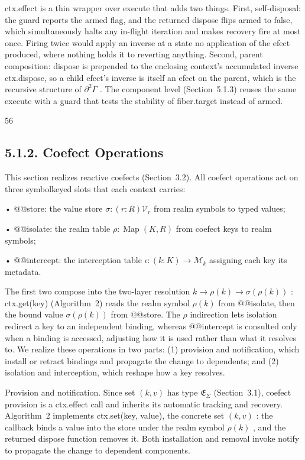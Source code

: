 \documentclass[
  10
]{article}
\begin{document}
ctx.effect is a thin wrapper over execute that adds two things. First,
self-disposal: the guard reports the armed flag, and the returned
dispose flips armed to false, which simultaneously halts any in-flight
iteration and makes recovery fire at most once. Firing twice would apply
an inverse at a state no application of the efect produced, where
nothing holds it to reverting anything. Second, parent composition:
dispose is prepended to the enclosing context's accumulated inverse
ctx.dispose, so a child efect's inverse is itself an efect on the
parent, which is the recursive structure of \(\partial ^ { 2 } \Gamma\)
. The component level (Section~5.1.3) reuses the same execute with a
guard that tests the stability of fiber.target instead of armed.

56

\subsection{5.1.2. Coefect Operations}\label{coefect-operations}

This section realizes reactive coefects (Section~3.2). All coefect
operations act on three symbolkeyed slots that each context carries:

• @@store: the value store
\(\sigma : ( r : R )  \mathcal { V } _ { r }\) from realm symbols to
typed values;

• @@isolate: the realm table
\(\rho : \operatorname { M a p } ( K , R )\) from coefect keys to realm
symbols;

• @@intercept: the interception table
\(\iota : ( k : K ) \to { \mathcal { M } } _ { k }\) assigning each key
its metadata.

The first two compose into the two-layer resolution
\(k \to \rho ( k ) \to \sigma ( \rho ( k ) )\) : ctx.get(key)
(Algorithm~2) reads the realm symbol \(\rho ( k )\) from @@isolate, then
the bound value \(\sigma ( \rho ( k ) )\) from @@store. The \(\rho\)
indirection lets isolation redirect a key to an independent binding,
whereas @@intercept is consulted only when a binding is accessed,
adjusting how it is used rather than what it resolves to. We realize
these operations in two parts: (1) provision and notification, which
install or retract bindings and propagate the change to dependents; and
(2) isolation and interception, which reshape how a key resolves.

Provision and notification. Since set \(( k , v )\) has type
\(\mathfrak { E } _ { \Sigma }\) (Section~3.1), coefect provision is a
ctx.effect call and inherits its automatic tracking and recovery.
Algorithm~2 implements ctx.set(key, value), the concrete set
\(( k , v )\) : the callback binds a value into the store under the
realm symbol \(\rho ( k )\) , and the returned dispose function removes
it. Both installation and removal invoke notify to propagate the change
to dependent components.
\end{document}
